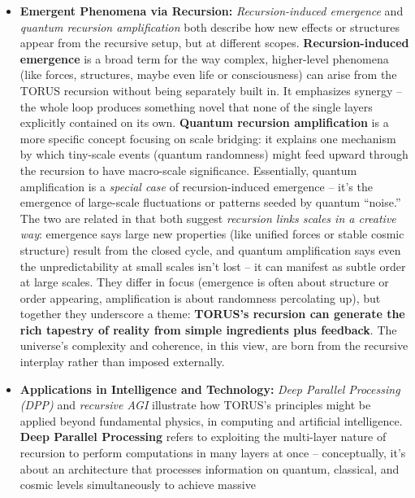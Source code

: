 \documentclass[
]{article}
\begin{document}
{\begin{itemize}
  \textbf{mathematical consistency across 14 dimensions yields the known
  symmetries and laws} as natural byproducts.
\item
  \textbf{Emergent Phenomena via Recursion:} \emph{Recursion-induced
  emergence} and \emph{quantum recursion amplification} both describe
  how new effects or structures appear from the recursive setup, but at
  different scopes. \textbf{Recursion-induced emergence} is a broad term
  for the way complex, higher-level phenomena (like forces, structures,
  maybe even life or consciousness) can arise from the TORUS recursion
  without being separately built in. It emphasizes synergy -- the whole
  loop produces something novel that none of the single layers
  explicitly contained on its own\hspace{0pt}. \textbf{Quantum recursion
  amplification} is a more specific concept focusing on scale bridging:
  it explains one mechanism by which tiny-scale events (quantum
  randomness) might feed upward through the recursion to have
  macro-scale significance\hspace{0pt}. Essentially, quantum
  amplification is a \emph{special case} of recursion-induced emergence
  -- it's the emergence of large-scale fluctuations or patterns seeded
  by quantum ``noise.'' The two are related in that both suggest
  \emph{recursion links scales in a creative way}: emergence says large
  new properties (like unified forces or stable cosmic structure) result
  from the closed cycle, and quantum amplification says even the
  unpredictability at small scales isn't lost -- it can manifest as
  subtle order at large scales. They differ in focus (emergence is often
  about structure or order appearing, amplification is about randomness
  percolating up), but together they underscore a theme: \textbf{TORUS's
  recursion can generate the rich tapestry of reality from simple
  ingredients plus feedback}. The universe's complexity and coherence,
  in this view, are born from the recursive interplay rather than
  imposed externally.
\item
  \textbf{Applications in Intelligence and Technology:} \emph{Deep
  Parallel Processing (DPP)} and \emph{recursive AGI} illustrate how
  TORUS's principles might be applied beyond fundamental physics, in
  computing and artificial intelligence. \textbf{Deep Parallel
  Processing} refers to exploiting the multi-layer nature of recursion
  to perform computations in many layers at once -- conceptually, it's
  about an architecture that processes information on quantum,
  classical, and cosmic levels simultaneously to achieve massive

\end{itemize}}
\end{document}
